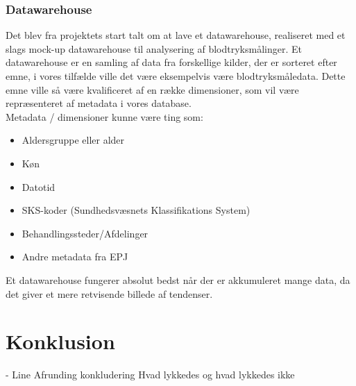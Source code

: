 \subsection{Datawarehouse}
Det blev fra projektets start talt om at lave et datawarehouse, realiseret med et slags mock-up datawarehouse til analysering af blodtryksmålinger. Et datawarehouse er en samling af data fra forskellige kilder, der er sorteret efter emne, i vores tilfælde ville det være eksempelvis være blodtryksmåledata. Dette emne ville så være kvalificeret af en række dimensioner, som vil være repræsenteret af metadata i vores database.\\ 
Metadata / dimensioner kunne være ting som:
\begin{itemize}
\item Aldersgruppe eller alder
\item Køn
\item Datotid
\item SKS-koder (Sundhedsvæsnets Klassifikations System)
\item Behandlingssteder/Afdelinger
\item Andre metadata fra EPJ
\end{itemize}
Et datawarehouse fungerer absolut bedst når der er akkumuleret mange data, da det giver et mere retvisende billede af tendenser. 
\chapter{Konklusion}
- Line
Afrunding
konkludering
Hvad lykkedes og hvad lykkedes ikke
